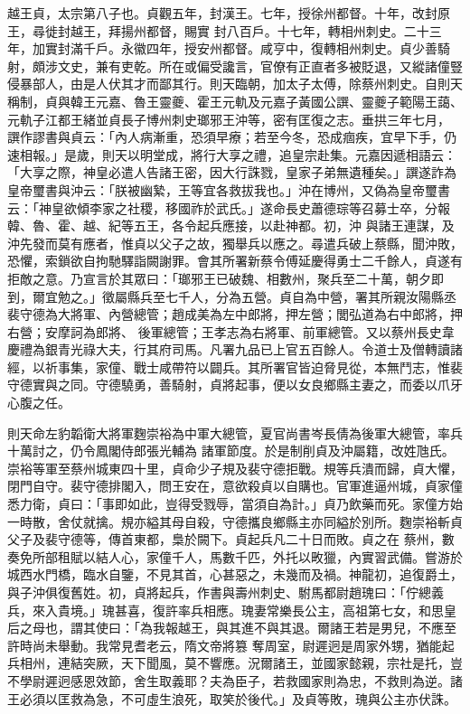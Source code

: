 \begin{pinyinscope}
 越王貞，太宗第八子也。貞觀五年，封漢王。七年，授徐州都督。十年，改封原王，尋徙封越王，拜揚州都督，賜實
 封八百戶。十七年，轉相州刺史。二十三年，加實封滿千戶。永徽四年，授安州都督。咸亨中，復轉相州刺史。貞少善騎射，頗涉文史，兼有吏乾。所在或偏受讒言，官僚有正直者多被貶退，又縱諸僮豎侵暴部人，由是人伏其才而鄙其行。則天臨朝，加太子太傅，除蔡州刺史。自則天稱制，貞與韓王元嘉、魯王靈夔、霍王元軌及元嘉子黃國公譔、靈夔子範陽王藹、元軌子江都王緒並貞長子博州刺史瑯邪王沖等，密有匡復之志。垂拱三年七月，
 譔作謬書與貞云：「內人病漸重，恐須早療；若至今冬，恐成痼疾，宜早下手，仍速相報。」是歲，則天以明堂成，將行大享之禮，追皇宗赴集。元嘉因遞相語云：「大享之際，神皇必遣人告諸王密，因大行誅戮，皇家子弟無遺種矣。」譔遂詐為皇帝璽書與沖云：「朕被幽縶，王等宜各救拔我也。」沖在博州，又偽為皇帝璽書云：「神皇欲傾李家之社稷，移國祚於武氏。」遂命長史蕭德琮等召募士卒，分報韓、魯、霍、越、紀等五王，各令起兵應接，以赴神都。初，沖
 與諸王連謀，及沖先發而莫有應者，惟貞以父子之故，獨舉兵以應之。尋遣兵破上蔡縣，聞沖敗，恐懼，索鎖欲自拘馳驛詣闕謝罪。會其所署新蔡令傅延慶得勇士二千餘人，貞遂有拒敵之意。乃宣言於其眾曰：「瑯邪王已破魏、相數州，聚兵至二十萬，朝夕即到，爾宜勉之。」徵屬縣兵至七千人，分為五營。貞自為中營，署其所親汝陽縣丞裴守德為大將軍、內營總管；趙成美為左中郎將，押左營；閭弘道為右中郎將，押右營；安摩訶為郎將、
 後軍總管；王孝志為右將軍、前軍總管。又以蔡州長史韋慶禮為銀青光祿大夫，行其府司馬。凡署九品已上官五百餘人。令道士及僧轉讀諸經，以祈事集，家僮、戰士咸帶符以闢兵。其所署官皆迫脅見從，本無鬥志，惟裴守德實與之同。守德驍勇，善騎射，貞將起事，便以女良鄉縣主妻之，而委以爪牙心腹之任。



 則天命左豹韜衛大將軍麴崇裕為中軍大總管，夏官尚書岑長倩為後軍大總管，率兵十萬討之，仍令鳳閣侍郎張光輔為
 諸軍節度。於是制削貞及沖屬籍，改姓虺氏。崇裕等軍至蔡州城東四十里，貞命少子規及裴守德拒戰。規等兵潰而歸，貞大懼，閉門自守。裴守德排閣入，問王安在，意欲殺貞以自購也。官軍進逼州城，貞家僮悉力衛，貞曰：「事即如此，豈得受戮辱，當須自為計。」貞乃飲藥而死。家僮方始一時散，舍仗就擒。規亦縊其母自殺，守德攜良鄉縣主亦同縊於別所。麴崇裕斬貞父子及裴守德等，傳首東都，梟於闕下。貞起兵凡二十日而敗。貞之在
 蔡州，數奏免所部租賦以結人心，家僮千人，馬數千匹，外托以畋獵，內實習武備。嘗游於城西水門橋，臨水自鑒，不見其首，心甚惡之，未幾而及禍。神龍初，追復爵土，與子沖俱復舊姓。初，貞將起兵，作書與壽州刺史、駙馬都尉趙瑰曰：「佇總義兵，來入貴境。」瑰甚喜，復許率兵相應。瑰妻常樂長公主，高祖第七女，和思皇后之母也，謂其使曰：「為我報越王，與其進不與其退。爾諸王若是男兒，不應至許時尚未舉動。我常見耆老云，隋文帝將篡
 奪周室，尉遲迥是周家外甥，猶能起兵相州，連結突厥，天下聞風，莫不響應。況爾諸王，並國家懿親，宗社是托，豈不學尉遲迥感恩效節，舍生取義耶？夫為臣子，若救國家則為忠，不救則為逆。諸王必須以匡救為急，不可虛生浪死，取笑於後代。」及貞等敗，瑰與公主亦伏誅。




\end{pinyinscope}
